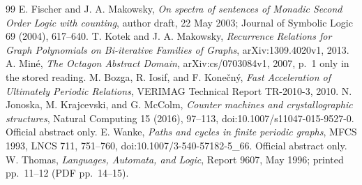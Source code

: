 \documentclass[11pt]{amsart}
\theoremstyle{definition}\newtheorem{definition}{Definition}
\begin{document}
\begin{thebibliography}{99}
 E. Fischer and J. A. Makowsky,
\emph{On spectra of sentences of Monadic Second Order Logic with counting},
author draft, 22 May 2003; Journal of Symbolic Logic 69 (2004), 617--640.
 T. Kotek and J. A. Makowsky,
\emph{Recurrence Relations for Graph Polynomials on Bi-iterative
Families of Graphs}, arXiv:1309.4020v1, 2013.
 A. Min\'e, \emph{The Octagon Abstract Domain},
arXiv:cs/0703084v1, 2007, p.~1 only in the stored reading.
 M. Bozga, R. Iosif, and F. Kone\v{c}n\'y,
\emph{Fast Acceleration of Ultimately Periodic Relations},
VERIMAG Technical Report TR-2010-3, 2010.
 N. Jonoska, M. Krajcevski, and G. McColm,
\emph{Counter machines and crystallographic structures},
Natural Computing 15 (2016), 97--113,
doi:10.1007/s11047-015-9527-0. Official abstract only.
 E. Wanke, \emph{Paths and cycles in finite periodic graphs},
MFCS 1993, LNCS 711, 751--760,
doi:10.1007/3-540-57182-5\_66. Official abstract only.
 W. Thomas, \emph{Languages, Automata, and Logic},
Report 9607, May 1996; printed pp.~11--12 (PDF pp.~14--15).
\end{thebibliography}
\end{document}
